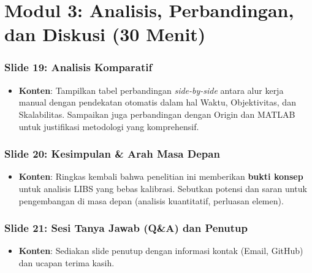 \documentclass[12pt, a4paper]{article}
\begin{document}
\section{Modul 3: Analisis, Perbandingan, dan Diskusi (30 Menit)}

\subsubsection*{Slide 19: Analisis Komparatif}
\begin{itemize}
    \item \textbf{Konten}: Tampilkan tabel perbandingan \textit{side-by-side} antara alur kerja manual dengan pendekatan otomatis dalam hal Waktu, Objektivitas, dan Skalabilitas. Sampaikan juga perbandingan dengan Origin dan MATLAB untuk justifikasi metodologi yang komprehensif.
\end{itemize}

\subsubsection*{Slide 20: Kesimpulan \& Arah Masa Depan}
\begin{itemize}
    \item \textbf{Konten}: Ringkas kembali bahwa penelitian ini memberikan \textbf{bukti konsep} untuk analisis LIBS yang bebas kalibrasi. Sebutkan potensi dan saran untuk pengembangan di masa depan (analisis kuantitatif, perluasan elemen).
\end{itemize}

\subsubsection*{Slide 21: Sesi Tanya Jawab (Q\&A) dan Penutup}
\begin{itemize}
    \item \textbf{Konten}: Sediakan slide penutup dengan informasi kontak (Email, GitHub) dan ucapan terima kasih.
\end{itemize}
\end{document}
